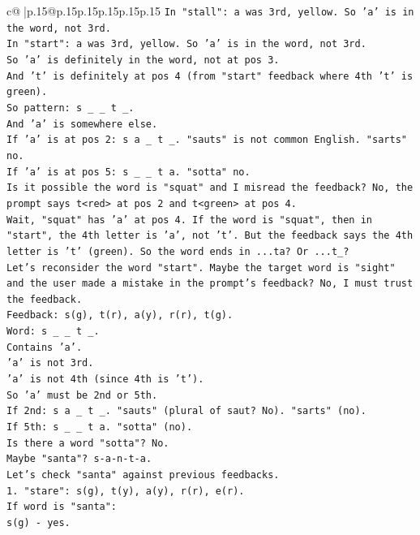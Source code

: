 \documentclass{article}
\begin{document}
{\begin{supertabular}{c@{$\;$}|p{.15\linewidth}@{}p{.15\linewidth}p{.15\linewidth}p{.15\linewidth}p{.15\linewidth}p{.15\linewidth}}
{{{\texttt{In "stall": a was 3rd, yellow. So 'a' is in the word, not 3rd.} \\
\texttt{In "start": a was 3rd, yellow. So 'a' is in the word, not 3rd.} \\
\texttt{So 'a' is definitely in the word, not at pos 3.} \\
\texttt{And 't' is definitely at pos 4 (from "start" feedback where 4th 't' is green).} \\
\texttt{So pattern: s \_ \_ t \_.} \\
\texttt{And 'a' is somewhere else.} \\
\texttt{If 'a' is at pos 2: s a \_ t \_. "sauts" is not common English. "sarts" no.} \\
\texttt{If 'a' is at pos 5: s \_ \_ t a. "sotta" no.} \\
\texttt{Is it possible the word is "squat" and I misread the feedback? No, the prompt says t<red> at pos 2 and t<green> at pos 4.} \\
\texttt{Wait, "squat" has 'a' at pos 4. If the word is "squat", then in "start", the 4th letter is 'a', not 't'. But the feedback says the 4th letter is 't' (green). So the word ends in ...ta? Or ...t\_?} \\
\texttt{Let's reconsider the word "start". Maybe the target word is "sight" and the user made a mistake in the prompt's feedback? No, I must trust the feedback.} \\
\texttt{Feedback: s(g), t(r), a(y), r(r), t(g).} \\
\texttt{Word: s \_ \_ t \_.} \\
\texttt{Contains 'a'.} \\
\texttt{'a' is not 3rd.} \\
\texttt{'a' is not 4th (since 4th is 't').} \\
\texttt{So 'a' must be 2nd or 5th.} \\
\texttt{If 2nd: s a \_ t \_. "sauts" (plural of saut? No). "sarts" (no).} \\
\texttt{If 5th: s \_ \_ t a. "sotta" (no).} \\
\texttt{Is there a word "sotta"? No.} \\
\texttt{Maybe "santa"? s{-}a{-}n{-}t{-}a.} \\
\texttt{Let's check "santa" against previous feedbacks.} \\
\texttt{1. "stare": s(g), t(y), a(y), r(r), e(r).} \\
\texttt{If word is "santa":} \\
\texttt{s(g) {-} yes.} \\
}}}
\end{supertabular}}
\end{document}

